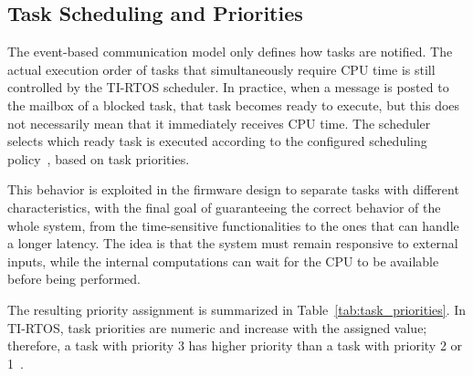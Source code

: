 \subsection{Task Scheduling and Priorities}

The event-based communication model only defines how tasks are notified. The actual execution order of tasks that simultaneously require CPU time is still controlled by the TI-RTOS scheduler. In practice, when a message is posted to the mailbox of a blocked task, that task becomes ready to execute, but this does not necessarily mean that it immediately receives CPU time. The scheduler selects which ready task is executed according to the configured scheduling policy~\cite{ti_sysbios_user_guide}, based on task priorities.


This behavior is exploited in the firmware design to separate tasks with different characteristics, with the final goal of guaranteeing the correct behavior of the whole system, from the time-sensitive functionalities to the ones that can handle a longer latency. The idea is that the system must remain responsive to external inputs, while the internal computations can wait for the CPU to be available before being performed.

The resulting priority assignment is summarized in Table~\ref{tab:task_priorities}. In TI-RTOS, task priorities are numeric and increase with the assigned value; therefore, a task with priority 3 has higher priority than a task with priority 2 or 1~\cite{ti_sysbios_task}.

